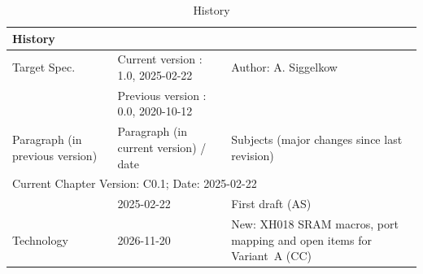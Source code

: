 \begin{table}[H]
\caption{History}
\label{tab:arch_history01}
\centering
\begin{tabularx}{\textwidth}{|X |X |X |}
  \hline
  \multicolumn{3}{|l|}{History} \\
  \hline
  \multicolumn{1}{|l}{Target Spec.} & \multicolumn{1}{l}{Current version : 1.0, 2025-02-22} & \multicolumn{1}{l|}{Author: A. Siggelkow}\\
  \multicolumn{1}{|l}{ } & \multicolumn{1}{l}{Previous version : 0.0, 2020-10-12} & \multicolumn{1}{l|}{ }\\
  \hline
  \hline
  Paragraph (in previous version) & Paragraph (in current version) / date & Subjects (major changes since last revision) \\
  \hline
  \hline
  \multicolumn{3}{|l|}{Current Chapter Version: C0.1; Date: 2025-02-22} \\
  \hline
  & 2025-02-22 & First draft (AS) \\
  \hline
  Technology & 2026-11-20 & New: XH018 SRAM macros, port mapping and open items for Variant~A (CC) \\
  \hline
\end{tabularx}
\end{table}
